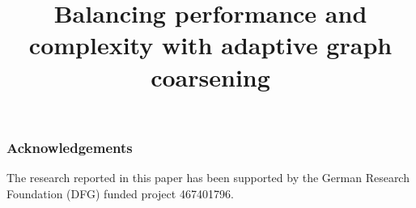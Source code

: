 \documentclass{llncs}
\begin{document}
\title{Balancing performance and complexity with adaptive graph coarsening}


\author{}

\institute{}

\maketitle











\subsubsection{Acknowledgements}

The research reported in this paper has been supported by the German Research Foundation (DFG) funded project 467401796.



\end{document}
